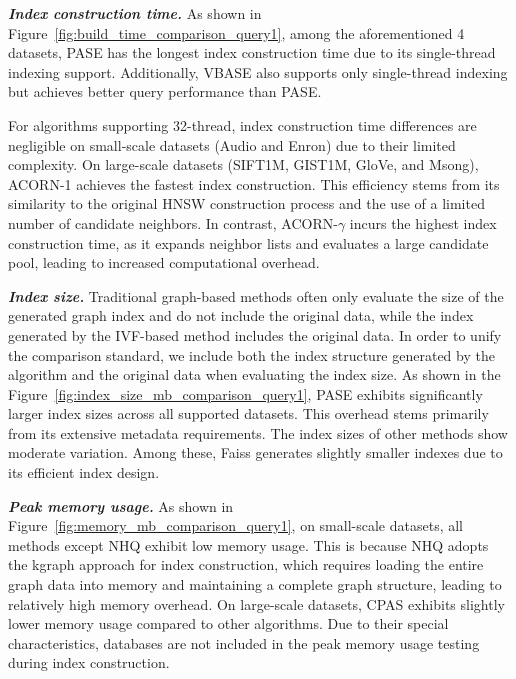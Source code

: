 \documentclass[sigconf, nonacm]{acmart}
\begin{document}
\textit{\textbf{Index construction time.}}
As shown in Figure~\ref{fig:build_time_comparison_query1}, among the aforementioned 4 datasets, PASE has the longest index construction time due to its single-thread indexing support. Additionally, VBASE also supports only single-thread indexing but achieves better query performance than PASE.

For algorithms supporting 32-thread, index construction time differences are negligible on small-scale datasets (Audio and Enron) due to their limited complexity. On large-scale datasets (SIFT1M, GIST1M, GloVe, and Msong), ACORN-1 achieves the fastest index construction. This efficiency stems from its similarity to the original HNSW construction process and the use of a limited number of candidate neighbors. In contrast, ACORN-$\gamma$ incurs the highest index construction time, as it expands neighbor lists and evaluates a large candidate pool, leading to increased computational overhead.


\textit{\textbf{Index size.}}
Traditional graph-based methods often only evaluate the size of the generated graph index and do not include the original data, while the index generated by the IVF-based method includes the original data. In order to unify the comparison standard, 
we include both the index structure generated by the algorithm and the original data when evaluating the index size. 
As shown in the Figure~\ref{fig:index_size_mb_comparison_query1}, PASE exhibits significantly larger index sizes across all supported datasets. This overhead stems primarily from its extensive metadata requirements. The index sizes of other methods show moderate variation. Among these, Faiss generates slightly smaller indexes due to its efficient index design.



\textit{\textbf{Peak memory usage.}}
As shown in Figure~\ref{fig:memory_mb_comparison_query1}, on small-scale datasets, all methods except NHQ exhibit low memory usage. This is because NHQ adopts the kgraph approach for index construction, which requires loading the entire graph data into memory and maintaining a complete graph structure, leading to relatively high memory overhead. On large-scale datasets, CPAS exhibits slightly lower memory usage compared to other algorithms. Due to their special characteristics, databases are not included in the peak memory usage testing during index construction.
\end{document}
